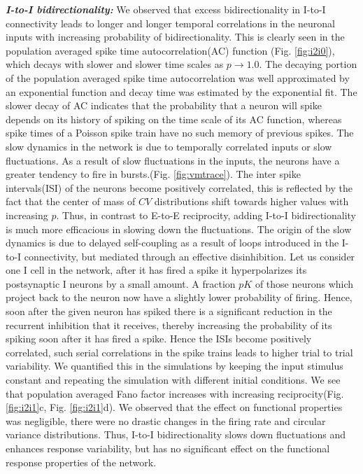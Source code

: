 \emph{\textbf{I-to-I bidirectionality:}} We observed that excess bidirectionality in I-to-I connectivity leads to longer and longer temporal correlations in the neuronal inputs with increasing probability of bidirectionality. This is clearly seen in the population averaged spike time autocorrelation(AC) function (Fig. \ref{fig:i2i0}), which decays with slower and slower time scales as $p \rightarrow 1.0$. The decaying portion of the population averaged spike time autocorrelation was well approximated by an exponential function and decay time was estimated by the exponential fit. The slower decay of AC indicates that the probability that a neuron will spike depends on its history of spiking on the time scale of its AC function, whereas spike times of a Poisson spike train have no such memory of previous spikes. The slow dynamics in the network is due to temporally correlated inputs or slow fluctuations. As a result of slow fluctuations in the inputs, the neurons have a greater tendency to fire in bursts.(Fig. \ref{fig:vmtrace}). The inter spike intervals(ISI) of the neurons become positively correlated, this is reflected by the fact that the center of mass of $CV$ distributions shift towards higher values with increasing $p$. Thus, in contrast to E-to-E reciprocity, adding I-to-I bidirectionality is much more efficacious in slowing down the fluctuations. The origin of the slow dynamics is due to delayed self-coupling as a result of loops introduced in the I-to-I connectivity, but mediated through an effective disinhibition. Let us consider one I cell in the network, after it has fired a spike it hyperpolarizes its postsynaptic I neurons by a small amount. A fraction $pK$ of those neurons which project back to the neuron now have a slightly lower probability of firing. Hence, soon after the given neuron has spiked there is a significant reduction in the recurrent inhibition that it receives, thereby increasing the probability of its spiking soon after it has fired a spike. Hence the ISIs become positively correlated, such serial correlations in the spike trains leads to higher trial to trial variability. We quantified this in the simulations by keeping the input stimulus constant and repeating the simulation with different initial conditions. We see that population averaged Fano factor increases with increasing reciprocity(Fig. \ref{fig:i2i1}c, Fig. \ref{fig:i2i1}d). We observed that the effect on functional properties was negligible, there were no drastic changes in the firing rate and circular variance distributions. Thus, I-to-I bidirectionality slows down fluctuations and enhances response variability, but has no significant effect on the functional response properties of the network. \\

